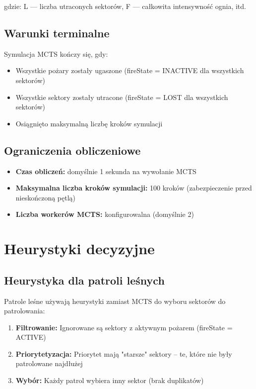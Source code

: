 \documentclass[11pt,a4paper]{article}
\begin{document}
gdzie:  
L — liczba utraconych sektorów, 
F — całkowita intensywność ognia, itd.

\subsection{Warunki terminalne}

Symulacja MCTS kończy się, gdy:
\begin{itemize}
    \item Wszystkie pożary zostały ugaszone (fireState = INACTIVE dla wszystkich sektorów)
    \item Wszystkie sektory zostały utracone (fireState = LOST dla wszystkich sektorów)
    \item Osiągnięto maksymalną liczbę kroków symulacji
\end{itemize}

\subsection{Ograniczenia obliczeniowe}

\begin{itemize}
    \item \textbf{Czas obliczeń:} domyślnie 1 sekunda na wywołanie MCTS
    \item \textbf{Maksymalna liczba kroków symulacji:} 100 kroków (zabezpieczenie przed nieskończoną pętlą)
    \item \textbf{Liczba workerów MCTS:} konfigurowalna (domyślnie 2)
\end{itemize}

\section{Heurystyki decyzyjne}

\subsection{Heurystyka dla patroli leśnych}
\label{sec:patrol-heuristic}

Patrole leśne używają heurystyki zamiast MCTS do wyboru sektorów do patrolowania:

\begin{enumerate}
    \item \textbf{Filtrowanie:} Ignorowane są sektory z aktywnym pożarem (fireState = ACTIVE)
    \item \textbf{Priorytetyzacja:} Priorytet mają "starsze" sektory -- te, które nie były patrolowane najdłużej
    \item \textbf{Wybór:} Każdy patrol wybiera inny sektor (brak duplikatów)
\end{enumerate}
\end{document}
